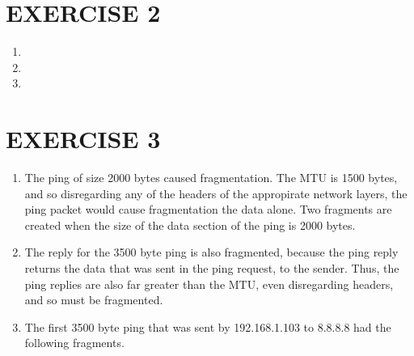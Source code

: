 \documentclass[a4paper,11pt]{article}
\begin{document}
\section{EXERCISE 2}
\begin{enumerate}[leftmargin=*]
	\item
	\item
	\item
\end{enumerate}



\section{EXERCISE 3}
\begin{enumerate}[leftmargin=*]
	\item The ping of size 2000 bytes caused fragmentation. The MTU is 1500 bytes, and so disregarding any of the headers of the appropirate network layers, the ping packet would cause fragmentation the data alone. Two fragments are created when the size of the data section of the ping is 2000 bytes.
	\item The reply for the 3500 byte ping is also fragmented, because the ping reply returns the data that was sent in the ping request, to the sender. Thus, the ping replies are also far greater than the MTU, even disregarding headers, and so must be fragmented.
	\item The first 3500 byte ping that was sent by 192.168.1.103 to 8.8.8.8 had the following fragments. 


\end{enumerate}
\end{document}
